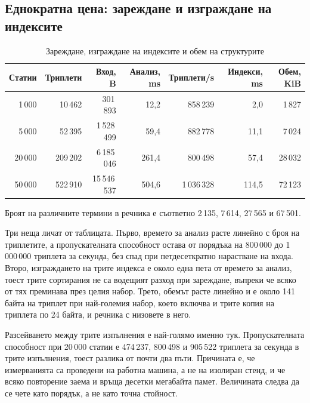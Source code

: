 \subsection{Еднократна цена: зареждане и изграждане на индексите}

\begin{table}[H]
\caption{Зареждане, изграждане на индексите и обем на структурите}
\label{tab:loading}
\centering
\fontsize{9}{11}\selectfont
\setlength{\tabcolsep}{4pt}
\begin{tabular}{@{}rrrrrrr@{}}
\toprule
\textbf{Статии} & \textbf{Триплети} & \textbf{Вход, B} & \textbf{Анализ, ms} & \textbf{Триплети/s} & \textbf{Индекси, ms} & \textbf{Обем, KiB} \\
\midrule
1\,000  &  10\,462 &     301\,893 &  12{,}2 &   858\,239 &   2{,}0 &  1\,827 \\
5\,000  &  52\,395 &  1\,528\,499 &  59{,}4 &   882\,778 &  11{,}1 &  7\,024 \\
20\,000 & 209\,202 &  6\,185\,046 & 261{,}4 &   800\,498 &  57{,}4 & 28\,032 \\
50\,000 & 522\,910 & 15\,546\,537 & 504{,}6 & 1\,036\,328 & 114{,}5 & 72\,123 \\
\bottomrule
\end{tabular}
\end{table}

Броят на различните термини в речника е съответно 2\,135, 7\,614, 27\,565 и 67\,501.

Три неща личат от таблицата. Първо, времето за анализ расте линейно с броя на триплетите,
а пропускателната способност остава от порядъка на 800\,000 до 1\,000\,000 триплета за
секунда, без спад при петдесеткратно нарастване на входа. Второ, изграждането на трите
индекса е около една пета от времето за анализ, тоест трите сортирания не са водещият
разход при зареждане, въпреки че всяко от тях преминава през целия набор. Трето, обемът
расте линейно и е около 141 байта на триплет при най-големия набор, което включва и трите
копия на триплета по 24 байта, и речника с низовете в него.

Разсейването между трите изпълнения е най-голямо именно тук. Пропускателната способност
при 20\,000 статии е 474\,237, 800\,498 и 905\,522 триплета за секунда в трите изпълнения,
тоест разлика от почти два пъти. Причината е, че измерванията са проведени на работна
машина, а не на изолиран стенд, и че всяко повторение заема и връща десетки мегабайта памет.
Величината следва да се чете като порядък, а не като точна стойност.

